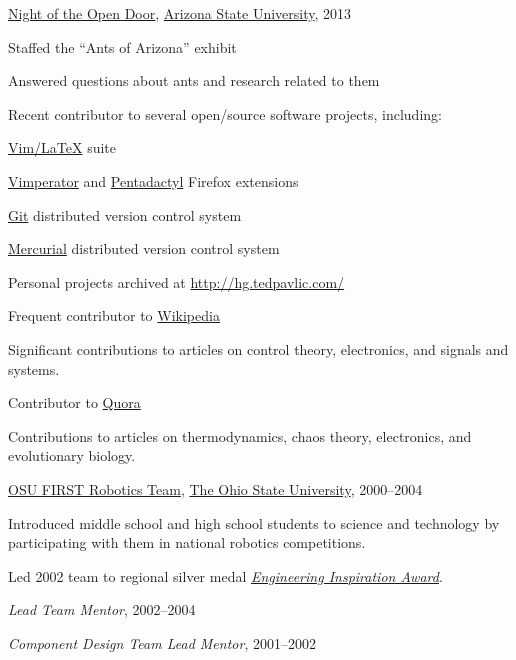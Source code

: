 \href{http://opendoor.asu.edu}{Night of the Open Door},
\href{http://www.asu.edu}{Arizona State University},
2013
%
\begin{innerlist}
    \item Staffed the ``Ants of Arizona'' exhibit
    \item Answered questions about ants and research related to them
\end{innerlist}

\halfblankline

Recent contributor to several open\-/source software projects, including:
\begin{innerlist}
    \item \href{http://vim-latex.sourceforge.net/}{Vim\-/LaTeX} suite
    \item \href{http://vimperator.org}{Vimperator} and
        \href{http://dactyl.sourceforge.net/pentadactyl/index}{Pentadactyl}
        Firefox extensions
    \item \href{http://git-scm.com}{Git} distributed version control
        system
    \item \href{http://www.selenic.com/mercurial/}{Mercurial} distributed version control
        system
    \item Personal projects archived at
        \url{http://hg.tedpavlic.com/}
\end{innerlist}

\halfblankline

Frequent contributor to \href{http://www.wikipedia.org/}{Wikipedia}
%
\begin{innerlist}
    \item Significant contributions to articles on control theory,
        electronics, and signals and systems.
\end{innerlist}

\halfblankline

Contributor to \href{http://www.quora.com/}{Quora}
%
\begin{innerlist}
    \item Contributions to articles on thermodynamics, chaos theory,
        electronics, and evolutionary biology.
\end{innerlist}

\halfblankline

\href{http://www.osufirst.org/}{OSU FIRST Robotics Team},
\href{http://www.osu.edu}{The Ohio State University}, 2000--2004
\begin{innerlist}
\item Introduced middle school and high school students to science and
        technology by participating with them in national robotics
        competitions.
\item Led 2002 team to regional silver medal
        \href{http://www.firstwiki.org/Engineering_Inspiration_Award}
             {\emph{Engineering Inspiration Award}}.
\item \emph{Lead Team Mentor}, 2002--2004
\item \emph{Component Design Team Lead Mentor}, 2001--2002
\end{innerlist}


